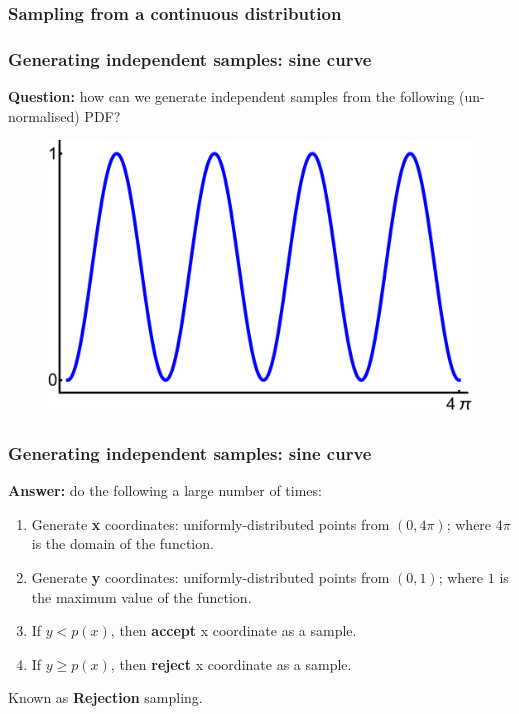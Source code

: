 \documentclass[handout]{beamer}
\begin{document}
\begin{frame}
\frametitle{Sampling from a continuous distribution}

\begin{figure}[t]
\centerline{}
\end{figure}

\end{frame}

\begin{frame}
\frametitle{Generating independent samples: sine curve}
 \textbf{Question:} how can we generate independent samples from the following (un-normalised) PDF?


\begin{figure}[ht]
\centerline{\includegraphics[width=1\textwidth]{animations_figures/lec4_rejection1.pdf}}
\end{figure}

\end{frame}

\begin{frame}
\frametitle{Generating independent samples: sine curve}
\textbf{Answer:} do the following a large number of times:

\begin{enumerate}
\item<2-> Generate \textbf{x} coordinates: uniformly-distributed points from $(0,4\pi)$; where $4\pi$ is the domain of the function.
\item<3-> Generate \textbf{y} coordinates: uniformly-distributed points from $(0,1)$; where $1$ is the maximum value of the function.
\item<4-> If $y < p(x)$, then \textbf{accept} x coordinate as a sample. 
\item<5-> If $y \geq p(x)$, then \textbf{reject} x coordinate as a sample. 
\end{enumerate}

 Known as \textbf{Rejection} sampling.

\end{frame}
\end{document}
